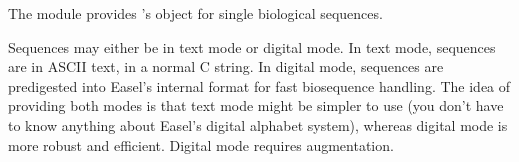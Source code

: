 The  module provides \Easel's object for single biological
sequences.

Sequences may either be in text mode or digital mode. In text mode,
sequences are in ASCII text, in a normal C string. In digital mode,
sequences are predigested into Easel's internal format for fast
biosequence handling. The idea of providing both modes is that text
mode might be simpler to use (you don't have to know anything about
Easel's digital alphabet system), whereas digital mode is more robust
and efficient. Digital mode requires  augmentation.





 





